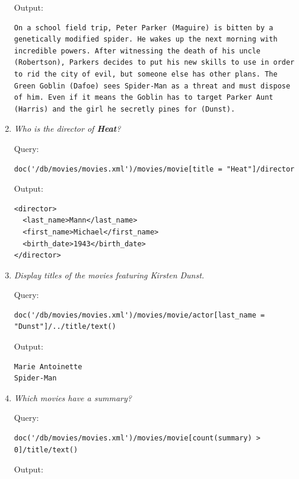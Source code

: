 \documentclass[a4paper, notitlepage]{article}
\begin{document}
\begin{enumerate}
Output:
  
\begin{lstlisting}
On a school field trip, Peter Parker (Maguire) is bitten by a genetically modified spider. He wakes up the next morning with incredible powers. After witnessing the death of his uncle (Robertson), Parkers decides to put his new skills to use in order to rid the city of evil, but someone else has other plans. The Green Goblin (Dafoe) sees Spider-Man as a threat and must dispose of him. Even if it means the Goblin has to target Parker Aunt (Harris) and the girl he secretly pines for (Dunst).
\end{lstlisting}  

\item 
  \emph{Who is the director of \textbf{Heat}?} 
  
Query: 
  
\begin{lstlisting}
doc('/db/movies/movies.xml')/movies/movie[title = "Heat"]/director
\end{lstlisting}
  
Output:
  
\begin{lstlisting}
<director>
  <last_name>Mann</last_name>
  <first_name>Michael</first_name>
  <birth_date>1943</birth_date>
</director>
\end{lstlisting}  
  
\item 
  \emph{Display titles of the movies featuring Kirsten Dunst.} 
  
Query: 
  
\begin{lstlisting}
doc('/db/movies/movies.xml')/movies/movie/actor[last_name = "Dunst"]/../title/text()
\end{lstlisting}
  
Output:
  
\begin{lstlisting}
Marie Antoinette
Spider-Man
\end{lstlisting}   

\item
  \emph{Which movies have a summary?}
  
Query:
  
\begin{lstlisting}
doc('/db/movies/movies.xml')/movies/movie[count(summary) > 0]/title/text()
\end{lstlisting}
  
Output:
  

\end{enumerate}
\end{document}
